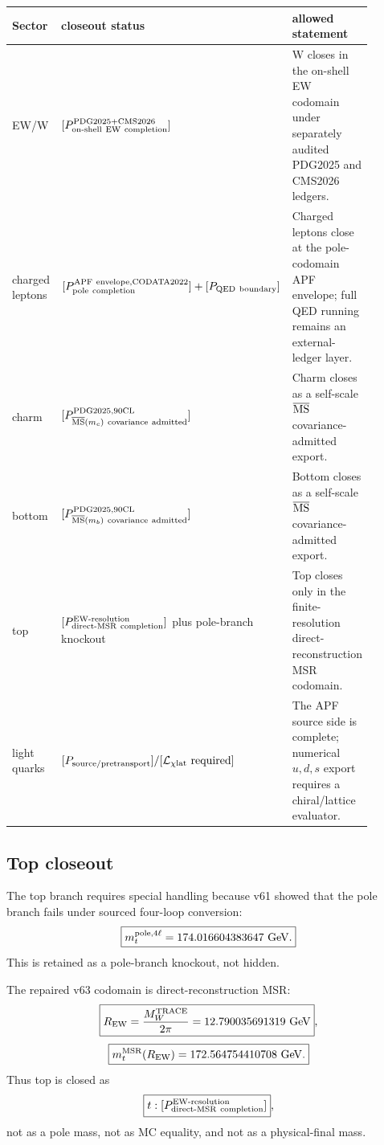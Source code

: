 \begin{center}
\renewcommand{\arraystretch}{1.18}
\begin{tabular}{p{0.17\linewidth}p{0.31\linewidth}p{0.41\linewidth}}
Sector & closeout status & allowed statement \\
\hline
EW/W & \([P_{\rm on\text{-}shell\ EW\ completion}^{\rm PDG2025+CMS2026}]
\) & W closes in the on-shell EW codomain under separately audited PDG2025 and CMS2026 ledgers. \\
charged leptons & \([P_{\rm pole\ completion}^{\rm APF\ envelope,CODATA2022}]+[P_{\rm QED\ boundary}]
\) & Charged leptons close at the pole-codomain APF envelope; full QED running remains an external-ledger layer. \\
charm & \([P_{\overline{\rm MS}(m_c)\ \rm covariance\ admitted}^{\rm PDG2025,90CL}]
\) & Charm closes as a self-scale \(\overline{\rm MS}\) covariance-admitted export. \\
bottom & \([P_{\overline{\rm MS}(m_b)\ \rm covariance\ admitted}^{\rm PDG2025,90CL}]
\) & Bottom closes as a self-scale \(\overline{\rm MS}\) covariance-admitted export. \\
top & \([P_{\rm direct\text{-}MSR\ completion}^{\rm EW\text{-}resolution}]
\) plus pole-branch knockout & Top closes only in the finite-resolution direct-reconstruction MSR codomain. \\
light quarks & \([P_{\rm source/pretransport}]/[\mathcal L_{\chi {\rm lat}}\ {\rm required}]
\) & The APF source side is complete; numerical \(u,d,s\) export requires a chiral/lattice evaluator. \\
\end{tabular}
\end{center}

\subsection{Top closeout}

The top branch requires special handling because v61 showed that the pole branch fails under sourced four-loop conversion:
\[
\boxed{m_t^{{\rm pole},4\ell}=174.016604383647\ {\rm GeV}.}
\]
This is retained as a pole-branch knockout, not hidden.

The repaired v63 codomain is direct-reconstruction MSR:
\[
\boxed{R_{\rm EW}={M_W^{\rm TRACE}\over 2\pi}=12.790035691319\ {\rm GeV}},
\]
\[
\boxed{m_t^{\rm MSR}(R_{\rm EW})=172.564754410708\ {\rm GeV}.}
\]
Thus top is closed as
\[
\boxed{t:[P_{\rm direct\text{-}MSR\ completion}^{\rm EW\text{-}resolution}]},
\]
not as a pole mass, not as MC equality, and not as a physical-final mass.

